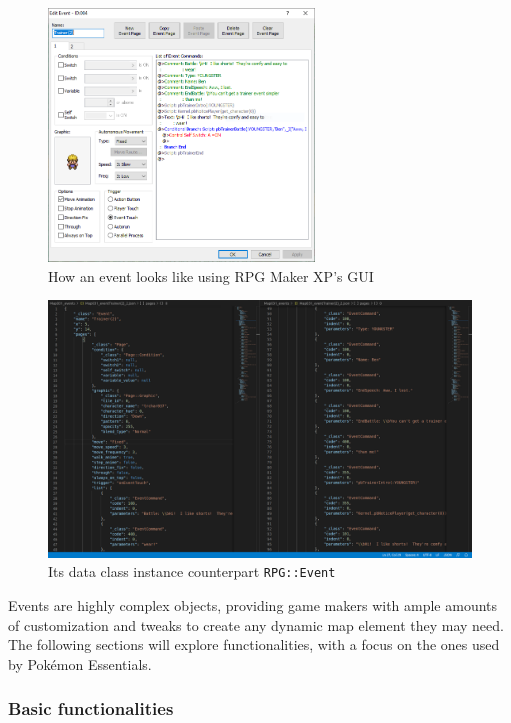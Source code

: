 \documentclass[11pt]{article}
\begin{document}
{%
\begin{figure}[!h]
	\centering
	\includegraphics[width=0.63\textwidth]{Event} 
	\caption{How an event looks like using RPG Maker XP's GUI }
	
\end{figure}

\newpage
\begin{figure}[!h]
	\centering
	\includegraphics[width=\textwidth]{Event_json}
	\caption{Its data class instance counterpart \texttt{RPG::Event}}
	
\end{figure}


Events are highly complex objects, providing game makers with ample amounts of customization and tweaks to create any dynamic map element they may need. The following sections will explore functionalities, with a focus on the ones used by Pokémon Essentials.




\subsubsection{Basic functionalities}

}
\end{document}
